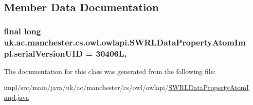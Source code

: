 \subsection{Member Data Documentation}
\hypertarget{classuk_1_1ac_1_1manchester_1_1cs_1_1owl_1_1owlapi_1_1_s_w_r_l_data_property_atom_impl_a4713585d5800e7349672fc26ea30782d}{
\subsubsection[{serial\-Version\-U\-I\-D}]{\setlength{\rightskip}{0pt plus 5cm}final long uk.\-ac.\-manchester.\-cs.\-owl.\-owlapi.\-S\-W\-R\-L\-Data\-Property\-Atom\-Impl.\-serial\-Version\-U\-I\-D = 30406\-L\hspace{0.3cm}{\ttfamily [static]}, {\ttfamily [private]}}}\label{classuk_1_1ac_1_1manchester_1_1cs_1_1owl_1_1owlapi_1_1_s_w_r_l_data_property_atom_impl_a4713585d5800e7349672fc26ea30782d}


The documentation for this class was generated from the following file\-:\begin{DoxyCompactItemize}
\item 
impl/src/main/java/uk/ac/manchester/cs/owl/owlapi/\hyperlink{_s_w_r_l_data_property_atom_impl_8java}{S\-W\-R\-L\-Data\-Property\-Atom\-Impl.\-java}\end{DoxyCompactItemize}
